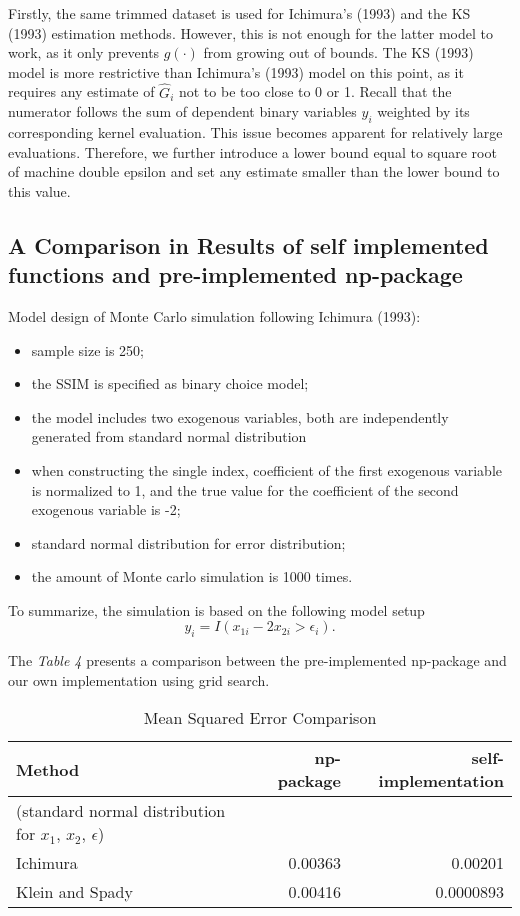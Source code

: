 Firstly, the same trimmed dataset is used for Ichimura's (1993) \cite{[6]} and the KS (1993) \cite{[12]} estimation methods. However, this is not enough for the latter model to work, as it only prevents $g(\cdot)$ from growing out of bounds.  The KS (1993) \cite{[12]} model is more restrictive than Ichimura's (1993) \cite{[6]} model on this point, as it requires any estimate of $\hat{G}_i$ not to be too close to 0 or 1. Recall that the numerator follows the sum of dependent binary variables $y_i$ weighted by its corresponding kernel evaluation. This issue becomes apparent for relatively large evaluations. Therefore, we further introduce a lower bound equal to square root of machine double epsilon and set any estimate smaller than the lower bound to this value.


\subsection{A Comparison in Results of self implemented functions and pre-implemented np-package}
Model design of Monte Carlo simulation following Ichimura (1993):
\begin{itemize}
\item sample size is 250;
\item the SSIM is specified as binary choice model;
\item the model includes two exogenous variables, both are independently generated from standard normal distribution  
\item when constructing the single index, coefficient of the first exogenous variable is normalized to 1, and the true value for the coefficient of the second exogenous variable is -2;
\item standard normal distribution for error distribution;
\item the amount of Monte carlo simulation is 1000 times.
\end{itemize}
To summarize, the simulation is based on the following model setup 
\begin{equation*}
y_i = I(x_{1i} - 2x_{2i} > \epsilon_i).
\end{equation*}

The \textit{Table 4} presents a comparison between the pre-implemented np-package and our own implementation using grid search.

\begin{table}[H]

\begin{tabular}{l r r}

\toprule
\textbf{Method} & \textbf{np-package} & \textbf{self-implementation} \tabularnewline\midrule
(standard normal distribution for $x_1$, $x_2$, $\epsilon$) & &
\tabularnewline
Ichimura & 0.00363 & 0.00201 \tabularnewline
Klein and Spady & 0.00416 & 0.0000893 \tabularnewline

\bottomrule
\end{tabular}
\caption {Mean Squared Error Comparison} \label{tab:mean squared error)
}

\end{table}

